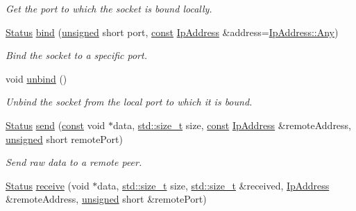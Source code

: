 \begin{DoxyCompactItemize}
\begin{DoxyCompactList}\small\item\em Get the port to which the socket is bound locally. \end{DoxyCompactList}\item 
\hyperlink{classsf_1_1_socket_a51bf0fd51057b98a10fbb866246176dc}{Status} \hyperlink{classsf_1_1_udp_socket_ad764c3d06d90b4714dcc97a0d1647bcc}{bind} (\hyperlink{curses_8priv_8h_aca40206900cfc164654362fa8d4ad1e6}{unsigned} short port, \hyperlink{term__entry_8h_a57bd63ce7f9a353488880e3de6692d5a}{const} \hyperlink{classsf_1_1_ip_address}{Ip\-Address} \&address=\hyperlink{classsf_1_1_ip_address_a3dbc10b0dc6804cc69e29342f7406907}{Ip\-Address\-::\-Any})
\begin{DoxyCompactList}\small\item\em Bind the socket to a specific port. \end{DoxyCompactList}\item 
void \hyperlink{classsf_1_1_udp_socket_a2c4abb8102a1bd31f51fcfe7f15427a3}{unbind} ()
\begin{DoxyCompactList}\small\item\em Unbind the socket from the local port to which it is bound. \end{DoxyCompactList}\item 
\hyperlink{classsf_1_1_socket_a51bf0fd51057b98a10fbb866246176dc}{Status} \hyperlink{classsf_1_1_udp_socket_a664ab8f26f37c21cc4de1b847c2efcca}{send} (\hyperlink{term__entry_8h_a57bd63ce7f9a353488880e3de6692d5a}{const} void $\ast$data, \hyperlink{nc__alloc_8h_a7b60c5629e55e8ec87a4547dd4abced4}{std\-::size\-\_\-t} size, \hyperlink{term__entry_8h_a57bd63ce7f9a353488880e3de6692d5a}{const} \hyperlink{classsf_1_1_ip_address}{Ip\-Address} \&remote\-Address, \hyperlink{curses_8priv_8h_aca40206900cfc164654362fa8d4ad1e6}{unsigned} short remote\-Port)
\begin{DoxyCompactList}\small\item\em Send raw data to a remote peer. \end{DoxyCompactList}\item 
\hyperlink{classsf_1_1_socket_a51bf0fd51057b98a10fbb866246176dc}{Status} \hyperlink{classsf_1_1_udp_socket_ade9ca0f7ed7919136917b0b997a9833a}{receive} (void $\ast$data, \hyperlink{nc__alloc_8h_a7b60c5629e55e8ec87a4547dd4abced4}{std\-::size\-\_\-t} size, \hyperlink{nc__alloc_8h_a7b60c5629e55e8ec87a4547dd4abced4}{std\-::size\-\_\-t} \&received, \hyperlink{classsf_1_1_ip_address}{Ip\-Address} \&remote\-Address, \hyperlink{curses_8priv_8h_aca40206900cfc164654362fa8d4ad1e6}{unsigned} short \&remote\-Port)

\end{DoxyCompactItemize}
